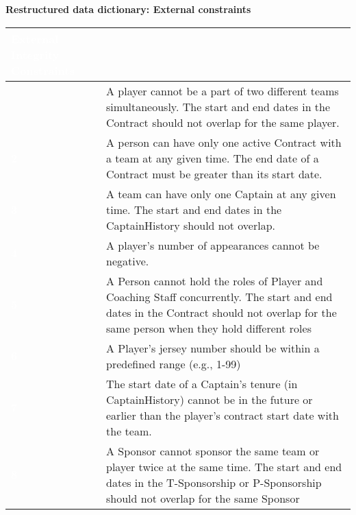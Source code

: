 \pagebreak

{\centering \textbf{Restructured data dictionary: External constraints}\\}

\begin{table}[H]
  \def\arraystretch{1.25}%
  \centering
  \begin{tabular}{|>{\columncolor{myColor}}  m{1.5cm} | m{13.5cm}| }
    \hline
    \rowcolor{myColor}
    \multicolumn{2}{| c |}  {\textcolor{white}{\large \textbf{External Integrity Constraints}}} \\
    \hline
     {\textcolor{white}{\textbf{1}}} & A player cannot be a part of two different teams simultaneously. The start and end dates in the Contract should not overlap for the same player. \\
    \hline
     {\textcolor{white}{\textbf{2}}} & A person can have only one active Contract with a team at any given time. The end date of a Contract must be greater than its start date.\\
    \hline
     {\textcolor{white}{\textbf{3}}} & A team can have only one Captain at any given time. The start and end dates in the CaptainHistory should not overlap. \\
    \hline
     {\textcolor{white}{\textbf{4}}} & A player’s number of appearances cannot be negative.\\
    \hline
     {\textcolor{white}{\textbf{5}}} & A Person cannot hold the roles of Player and Coaching Staff concurrently. The start and end dates in the Contract should not overlap for the same person when they hold different roles\\
    \hline
     {\textcolor{white}{\textbf{6}}} &A Player’s jersey number should be within a predefined range (e.g., 1-99) \\
    \hline
     {\textcolor{white}{\textbf{7}}} & The start date of a Captain’s tenure (in CaptainHistory) cannot be in the future or earlier than the player’s contract start date with the team.\\
    \hline
    {\textcolor{white}{\textbf{8}}} & A Sponsor cannot sponsor the same team or player twice at the same time. The start and end dates in the T-Sponsorship or P-Sponsorship should not overlap for the same Sponsor \\
    \hline
  \end{tabular}\label{tab:table10}
\end{table}

\pagebreak

